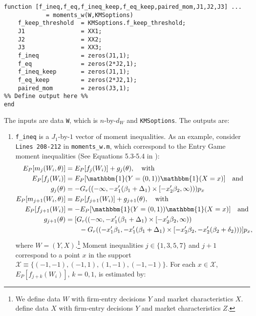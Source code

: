 \documentclass[12pt]{article}
\def\code#1{\texttt{#1}}
\begin{document}
\footnotesize
\begin{lstlisting}[backgroundcolor = \color{gray!30},
                   xleftmargin = 0cm,
                   framexleftmargin = 1em]
function [f_ineq,f_eq,f_ineq_keep,f_eq_keep,paired_mom,J1,J2,J3] ...
            = moments_w(W,KMSoptions)
    f_keep_threshold  = KMSoptions.f_keep_threshold;
    J1                = XX1;
    J2                = XX2;
    J3                = XX3;
    f_ineq            = zeros(J1,1);
    f_eq              = zeros(2*J2,1);
    f_ineq_keep       = zeros(J1,1);
    f_eq_keep         = zeros(2*J2,1);
    paired_mom        = zeros(J3,1);
%% Define output here %%
end
\end{lstlisting} \normalsize
The inputs are data \code{W}, which is $n$-by-$d_W$ and \code{KMSoptions}.  The outputs are:
\begin{enumerate}
\item \code{f\_ineq} is a $J_1$-by-$1$ vector of moment inequalities.  As an example, consider \code{Lines 208-212} in \code{moments\_w.m}, which correspond to the Entry Game moment inequalities (See Equations 5.3-5.4 in ):
    \footnotesize
    \begin{align*}
    E_P[m_{j}(W_i,\theta)] & = E_P[ f_{j}(W_i)] + g_{j}(\theta), \quad \text{with} \\
    E_P[ f_{j}(W_i)] & = E_P[\mathbbm{1}(Y = (0,1)) \mathbbm{1}(X = x)] \quad \text{and} \\
    g_{j}(\theta) &=  - G_r((-\infty,-x_1'(\beta_1 + \Delta_1) \times [-x_2'\beta_2,\infty)))p_x\\
     E_P[m_{j+1}(W_i,\theta)] & =E_P[ f_{j+1}(W_i)]  + g_{j+1}(\theta), \quad \text{with}   \\
  E_P[ f_{j+1}(W_i)] & = -E_P[\mathbbm{1}(Y = (0,1)) \mathbbm{1}(X = x)] \quad \text{and} \\
    g_{j+1}(\theta) & = [G_r((-\infty,-x_1'(\beta_1 + \Delta_1) \times [-x_2'\beta_2,\infty))  \\
    & \quad \quad -G_r((-x_1'\beta_1,-x_1'(\beta_1 + \Delta_1) \times [-x_2'\beta_2,-x_2'(\beta_2 + \delta_2)))]p_x,
    \end{align*}\normalsize
    where $W = (Y,X)$.\footnote{We define data $W$ with firm-entry decisions $Y$ and market characteristics $X$.  define data $X$ with firm-entry decisions $Y$ and market characteristics $Z$.} Moment inequalities $j \in \{1,3,5,7\}$ and $j+1$ correspond to a point $x$ in the support $\mathcal{X} \equiv \{(-1,-1),(-1,1),(1,-1),(-1,-1)\}$.  For each $x \in \mathcal{X}$,  $E_P[ f_{j+k}(W_i)]$, $k=0,1$,  is estimated by:

\end{enumerate}
\end{document}

